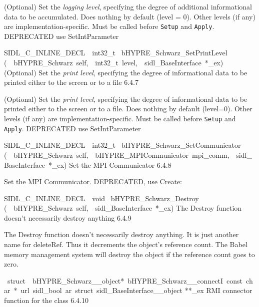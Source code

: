 \documentclass{article}
\begin{document}
\begin{cxxentry}
\begin{cxxentry}
\begin{cxxfunction}
\begin{cxxdoc}
(Optional) Set the {\it logging level}, specifying the degree
of additional informational data to be accumulated.  Does
nothing by default (level = 0).  Other levels (if any) are
implementation-specific.  Must be called before {\tt Setup}
and {\tt Apply}.
DEPRECATED   use SetIntParameter
\end{cxxdoc}
\end{cxxfunction}
\begin{cxxfunction}
{SIDL\_C\_INLINE\_DECL\ \ int32\_t\ }
        {bHYPRE\_Schwarz\_SetPrintLevel}
        {(\ \ bHYPRE\_Schwarz\ self,\ \ int32\_t\ level,\ \ sidl\_BaseInterface\ *\_ex)}
        {
(Optional) Set the {\it print level}, specifying the degree
of informational data to be printed either to the screen or
to a file}
        {6.4.7}
\begin{cxxdoc}

(Optional) Set the {\it print level}, specifying the degree
of informational data to be printed either to the screen or
to a file.  Does nothing by default (level=0).  Other levels
(if any) are implementation-specific.  Must be called before
{\tt Setup} and {\tt Apply}.
DEPRECATED   use SetIntParameter
\end{cxxdoc}
\end{cxxfunction}
\begin{cxxfunction}
{SIDL\_C\_INLINE\_DECL\ \ int32\_t\ }
        {bHYPRE\_Schwarz\_SetCommunicator}
        {(\ \ bHYPRE\_Schwarz\ self,\ \ bHYPRE\_MPICommunicator\ mpi\_comm,\ \ sidl\_BaseInterface\ *\_ex)}
        {
Set the MPI Communicator}
        {6.4.8}
\begin{cxxdoc}

Set the MPI Communicator.
DEPRECATED, use Create:
\end{cxxdoc}
\end{cxxfunction}
\begin{cxxfunction}
{SIDL\_C\_INLINE\_DECL\ \ void\ }
        {bHYPRE\_Schwarz\_Destroy}
        {(\ \ bHYPRE\_Schwarz\ self,\ \ sidl\_BaseInterface\ *\_ex)}
        {
The Destroy function doesn't necessarily destroy anything}
        {6.4.9}
\begin{cxxdoc}

The Destroy function doesn't necessarily destroy anything.
It is just another name for deleteRef.  Thus it decrements the
object's reference count.  The Babel memory management system will
destroy the object if the reference count goes to zero.
\end{cxxdoc}
\end{cxxfunction}
\begin{cxxvariable}
{\ struct\ \ bHYPRE\_Schwarz\_\_object*\ bHYPRE\_Schwarz\_\_connectI\ const\ char\ *\ url\ sidl\_bool\ ar\ struct\ sidl\_BaseInterface\_\_object}
        {**\_ex}
        {}
        {
RMI connector function for the class}
        {6.4.10}
\begin{cxxdoc}


\end{cxxdoc}
\end{cxxvariable}
\end{cxxentry}
\end{cxxentry}
\end{document}
